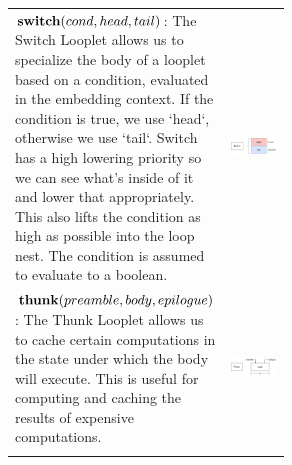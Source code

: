 \begin{figure}[ht]
\begin{tabular} {|p{0.65\linewidth}|c|}
\begin{minipage}[c]{0.25\linewidth}
    \end{minipage} \\ \hline
    \begin{minipage}[c]{0.65\linewidth}
        $\text{\textbf{switch}}(cond, head, tail)$: The Switch Looplet allows us to specialize the body of a looplet based on a condition, evaluated in the embedding context. If the condition is true, we use `head`, otherwise we use `tail`. Switch has a high lowering priority so we can see what's inside of it and lower that appropriately. This also lifts the condition as high as possible into the loop nest. The condition is assumed to evaluate to a boolean.
    \end{minipage} &
    \begin{minipage}[c]{0.25\linewidth}
        \centering
        \includegraphics[scale=0.20]{Looplets-switch.png}
    \end{minipage} \\ \hline
    \begin{minipage}[c]{0.65\linewidth}
        $\text{\textbf{thunk}}(preamble, body, epilogue)$: The Thunk Looplet allows us to cache certain computations in the state under which the body will execute. This is useful for computing and caching the results of expensive computations.
    \end{minipage} &
    \begin{minipage}[c]{0.25\linewidth}
        \centering
        \includegraphics[scale=0.20]{Looplets-thunk.png}
    \end{minipage} \\ \hline
    \begin{minipage}[c]{0.65\linewidth}

\end{minipage}
\end{tabular}
\end{figure}
